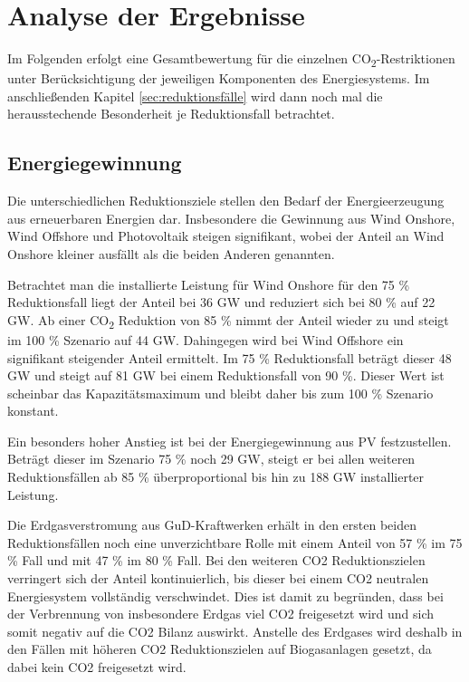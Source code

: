 \section{Analyse der Ergebnisse}
Im Folgenden erfolgt eine Gesamtbewertung für die einzelnen CO\textsubscript{2}-Restriktionen unter Berücksichtigung der jeweiligen Komponenten des Energiesystems. Im anschließenden Kapitel \ref{sec:reduktionsfälle} wird dann noch mal die herausstechende Besonderheit je Reduktionsfall betrachtet. 

\subsection{Energiegewinnung}
Die unterschiedlichen Reduktionsziele stellen den Bedarf der Energieerzeugung aus erneuerbaren Energien dar. Insbesondere die Gewinnung aus Wind Onshore, Wind Offshore und Photovoltaik steigen signifikant, wobei der Anteil an Wind Onshore kleiner ausfällt als die beiden Anderen genannten. 

Betrachtet man die installierte Leistung für Wind Onshore für den 75 \% Reduktionsfall liegt der Anteil bei 36 GW und reduziert sich bei 80 \% auf 22 GW. Ab einer CO\textsubscript{2} Reduktion von 85 \% nimmt der Anteil wieder zu und steigt im 100 \% Szenario auf 44 GW. 
Dahingegen wird bei Wind Offshore ein signifikant steigender Anteil ermittelt. Im 75 \% Reduktionsfall beträgt dieser 48 GW und steigt auf 81 GW bei einem Reduktionsfall von 90 \%. Dieser Wert ist scheinbar das Kapazitätsmaximum und bleibt daher bis zum 100 \% Szenario konstant.

Ein besonders hoher Anstieg ist bei der Energiegewinnung aus PV festzustellen. Beträgt dieser im Szenario 75 \% noch 29 GW, steigt er bei allen weiteren Reduktionsfällen ab 85 \% überproportional bis hin zu 188 GW installierter Leistung.

Die Erdgasverstromung aus GuD-Kraftwerken erhält in den ersten beiden Reduktionsfällen noch eine unverzichtbare Rolle mit einem Anteil von 57 \% im 75 \% Fall und mit 47 \% im 80 \% Fall. Bei den weiteren CO2 Reduktionszielen verringert sich der Anteil kontinuierlich, bis dieser bei einem CO2 neutralen Energiesystem vollständig verschwindet. Dies ist damit zu begründen, dass bei der Verbrennung von insbesondere Erdgas viel CO2 freigesetzt wird und sich somit negativ auf die CO2 Bilanz auswirkt. Anstelle des Erdgases wird deshalb in den Fällen mit höheren CO2 Reduktionszielen auf Biogasanlagen gesetzt, da dabei kein CO2 freigesetzt wird. 


